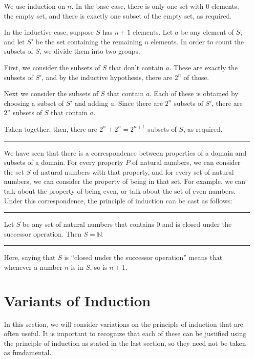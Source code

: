 \documentclass[letterpaper,10pt,english]{sphinxmanual}
\begin{document}
\sphinxAtStartPar
{} We use induction on \(n\). In the base case, there is only one set with \(0\) elements, the empty set, and there is exactly one subset of the empty set, as required.

\sphinxAtStartPar
In the inductive case, suppose \(S\) has \(n + 1\) elements. Let \(a\) be any element of \(S\), and let \(S'\) be the set containing the remaining \(n\) elements. In order to count the subsets of \(S\), we divide them into two groups.

\sphinxAtStartPar
First, we consider the subsets of \(S\) that don’t contain \(a\). These are exactly the subsets of \(S'\), and by the inductive hypothesis, there are \(2^n\) of those.

\sphinxAtStartPar
Next we consider the subsets of \(S\) that  contain \(a\). Each of these is obtained by choosing a subset of \(S'\) and adding \(a\). Since there are \(2^n\) subsets of \(S'\), there are \(2^n\) subsets of \(S\) that contain \(a\).

\sphinxAtStartPar
Taken together, then, there are \(2^n + 2^n = 2^{n+1}\) subsets of \(S\), as required.


\bigskip\hrule\bigskip


\sphinxAtStartPar
We have seen that there is a correspondence between properties of a domain and subsets of a domain. For every property \(P\) of natural numbers, we can consider the set \(S\) of natural numbers with that property, and for every set of natural numbers, we can consider the property of being in that set. For example, we can talk about the property of being even, or talk about the set of even numbers. Under this correspondence, the principle of induction can be cast as follows:


\bigskip\hrule\bigskip


\sphinxAtStartPar
{} Let \(S\) be any set of natural numbers that contains \(0\) and is closed under the successor operation. Then \(S = \mathbb{N}\).


\bigskip\hrule\bigskip


\sphinxAtStartPar
Here, saying that \(S\) is “closed under the successor operation” means that whenever a number \(n\) is in \(S\), so is \(n + 1\).


\section{Variants of Induction}
\label{\detokenize{the_natural_numbers_and_induction:variants-of-induction}}
\sphinxAtStartPar
In this section, we will consider variations on the principle of induction that are often useful. It is important to recognize that each of these can be justified using the principle of induction as stated in the last section, so they need not be taken as fundamental.
\end{document}
